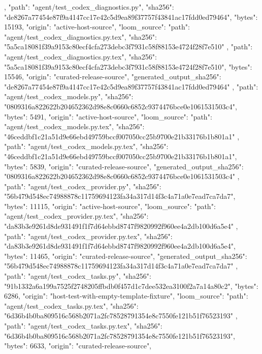 {{    },
    {
      "path": "agent/test_codex_diagnostics.py",
      "sha256": "de8267a77454e87f9a4147cc17e42c5d9ea89f37757f43841ac17fdd0ed79464",
      "bytes": 15193,
      "origin": "active-host-source",
      "loom_source": {
        "path": "agent/test_codex_diagnostics.py.tex",
        "sha256": "5a5ca18081f39a9153c80ecf4cfa273debc3f7931c58f88153e4724f28f7e510"
      }
    },
    {
      "path": "agent/test_codex_diagnostics.py.tex",
      "sha256": "5a5ca18081f39a9153c80ecf4cfa273debc3f7931c58f88153e4724f28f7e510",
      "bytes": 15546,
      "origin": "curated-release-source",
      "generated_output_sha256": "de8267a77454e87f9a4147cc17e42c5d9ea89f37757f43841ac17fdd0ed79464"
    },
    {
      "path": "agent/test_codex_models.py",
      "sha256": "0809316a822622b204652362d98e8c0660c6852c9374476bce0e1061531503c4",
      "bytes": 5491,
      "origin": "active-host-source",
      "loom_source": {
        "path": "agent/test_codex_models.py.tex",
        "sha256": "46ceddbf1c21a51d9e66ebd49759bccf007050cc25b9700e21b33176b1b801a1"
      }
    },
    {
      "path": "agent/test_codex_models.py.tex",
      "sha256": "46ceddbf1c21a51d9e66ebd49759bccf007050cc25b9700e21b33176b1b801a1",
      "bytes": 5839,
      "origin": "curated-release-source",
      "generated_output_sha256": "0809316a822622b204652362d98e8c0660c6852c9374476bce0e1061531503c4"
    },
    {
      "path": "agent/test_codex_provider.py",
      "sha256": "56b479d548ec74988878c11759694123fa34a317d14f3c4a71a0e7ead7ca7da7",
      "bytes": 11115,
      "origin": "active-host-source",
      "loom_source": {
        "path": "agent/test_codex_provider.py.tex",
        "sha256": "da83b3e9261d8de931491f1f7d64ebbd8747f9820992f960ee4a2db100d6a5e4"
      }
    },
    {
      "path": "agent/test_codex_provider.py.tex",
      "sha256": "da83b3e9261d8de931491f1f7d64ebbd8747f9820992f960ee4a2db100d6a5e4",
      "bytes": 11465,
      "origin": "curated-release-source",
      "generated_output_sha256": "56b479d548ec74988878c11759694123fa34a317d14f3c4a71a0e7ead7ca7da7"
    },
    {
      "path": "agent/test_codex_tasks.py",
      "sha256": "91b1332a6a199a7525f2748205ffbdb0f457d1c7dee532ea3100f2a7a14a80c2",
      "bytes": 6286,
      "origin": "host-test-with-empty-template-fixture",
      "loom_source": {
        "path": "agent/test_codex_tasks.py.tex",
        "sha256": "6d36b4b0ba809516c568b2071a2fc78528791354e8c7550fe121b51f76523193"
      }
    },
    {
      "path": "agent/test_codex_tasks.py.tex",
      "sha256": "6d36b4b0ba809516c568b2071a2fc78528791354e8c7550fe121b51f76523193",
      "bytes": 6633,
      "origin": "curated-release-source",
}}
